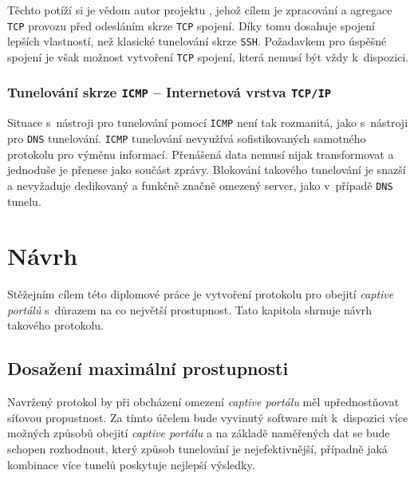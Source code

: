 \documentclass[thesis=M,czech]{FITthesis}[2012/10/20]
\begin{document}
Těchto potíží si je vědom autor projektu \cite[sshuttle]{sshuttle}, jehož cílem je zpracování a agregace \texttt{TCP} provozu před odesláním skrze \texttt{TCP} spojení. Díky tomu dosahuje spojení lepších vlastností, než klasické tunelování skrze \texttt{SSH}. Požadavkem pro úspěšné spojení je však možnost vytvoření \texttt{TCP} spojení, která nemusí být vždy k~dispozici.


\subsection{Tunelování skrze \texttt{ICMP} -- Internetová vrstva \texttt{TCP/IP}}

Situace s~nástroji pro tunelování pomocí \texttt{ICMP} není tak rozmanitá, jako s~nástroji pro \texttt{DNS} tunelování. \texttt{ICMP} tunelování nevyužívá sofistikovaných  samotného protokolu pro výměnu informací. Přenášená data nemusí nijak transformovat a jednoduše je přenese jako součást zprávy. Blokování takového tunelování je snazší a nevyžaduje dedikovaný a funkčně značně omezený server, jako v~případě \texttt{DNS} tunelu.













\chapter{Návrh}

Stěžejním cílem této diplomové práce je vytvoření protokolu pro obejití \textit{captive portálů} s~důrazem na co největší prostupnost. Tato kapitola shrnuje návrh takového protokolu.


\section{Dosažení maximální prostupnosti}

Navržený protokol by při obcházení omezení \textit{captive portálu} měl upřednostňovat síťovou propustnost. Za tímto účelem bude vyvinutý software mít k~dispozici více možných způsobů obejití \textit{captive portálu} a na základě naměřených dat se bude schopen rozhodnout, který způsob tunelování je nejefektivnější, případně jaká kombinace více tunelů poskytuje nejlepší výsledky.
\end{document}
